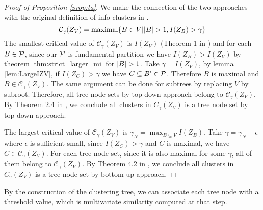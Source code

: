 \documentclass{article}
\begin{document}
\begin{proof}[Proof of Proposition \ref{prop:ta}]
We make the connection of the two approaches with the original definition of info-clusters in \cite{RN1}.
\begin{equation}\label{eq:def_CgammaZV}
\mathcal{C}_{\gamma}(Z_V) = \textrm{maximal}\{ B \in V \vert \abs{B} > 1, I(Z_B) > \gamma \}
\end{equation}
The smallest critical value of $\mathcal{C}_{\gamma}(Z_V)$ is $I(Z_V)$ (Theorem 1 in \cite{RN1}) and for each $B \in \P$, since  our $\P$ is fundamental partition we have $I(Z_B) > I(Z_V)$ by theorem \ref{thm:strict_larger_mi} for $\abs{B}>1$. Take $\gamma = I(Z_V)$, by lemma \ref{lem:LargeIZV}, if $I(Z_C) > \gamma$ we have $C\subseteq B' \in \P$. Therefore $B$ is maximal and $B\in \mathcal{C}_{\gamma}(Z_V)$. The same argument can be done for subtrees by replacing $V$ by subroot. Therefore, all tree node sets by top-down approach belong to $\mathcal{C}_{\gamma}(Z_V)$. By Theorem 2.4 in \cite{RN1}, we conclude all clusters in $C_{\gamma}(Z_V)$ is a tree node set by top-down approach.

The largest critical value of $\mathcal{C}_{\gamma}(Z_V)$ is $\gamma_N = \max_{B\subseteq V} I(Z_B)$. Take $\gamma = \gamma_N - \epsilon$ where $\epsilon$ is sufficient small, since $I(Z_C) > \gamma$ and $C$ is maximal, we have $C \in \mathcal{C}_{\gamma}(Z_V)$. For each tree node set, since it is also maximal for some $\gamma$, all of them belong to $\mathcal{C}_{\gamma}(Z_V)$. By Theorem 4.2 in \cite{RN8}, we conclude all clusters in $C_{\gamma}(Z_V)$ is a tree node set by bottom-up approach.
\end{proof}
By the construction of the clustering tree, we can associate each tree node with a threshold value, which is multivariate similarity computed at that step.
\end{document}
